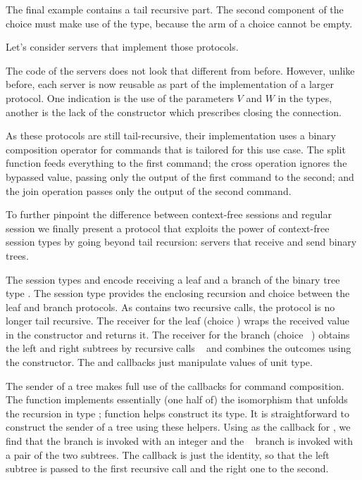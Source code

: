 \documentclass[acmsmall,screen,anonymous,review]{acmart}
\begin{document}
The final example {\Amanyunaryp} contains a tail recursive part. The
second component of the choice must make use of the {\Atcfskip} type,
because the arm of a choice cannot be empty.

Let's consider servers that implement those protocols.
\cstCmdExamples

The code of the servers does not look that different from
before. However, unlike before, each server is now reusable as part of
the implementation of a larger protocol. One indication is the use of
the parameters $V$ and $W$ in the types, another is the lack of the
{\ACEND} constructor which prescribes closing the connection.

As these protocols are still tail-recursive, their implementation uses
a binary composition operator for commands that is tailored for this
use case. The split function feeds everything to the first command; the
cross operation ignores the bypassed value, passing only the output of
the first command to the second; and the join operation passes only
the output of the second command.
\cstTailComposition


To further pinpoint the difference between context-free sessions and
regular session we finally present a protocol that
exploits the power of context-free session types by going beyond tail
recursion: servers that receive and send binary trees. 
\cstTreep

The session types {\Aleafp} and {\Abranchp} encode receiving a leaf and
a branch of the binary tree type {\AIntTree}. The session type
{\Atreep} provides the enclosing recursion and choice between the leaf
and branch protocols. As {\Abranchp} contains two recursive calls,
the protocol {\Atreep} is no longer tail recursive.
\cstRecvTree
The receiver for the leaf (choice {\Azero}) wraps the received value in the {\ACLeaf}
constructor and returns it.
The receiver for the branch (choice {\Asuc~\Azero}) obtains the left and right subtrees by
recursive calls {\ACONTINUE~\Azero} and combines the outcomes using
the {\ACBranch} constructor. The {\Asplit} and {\Across} callbacks
just manipulate values of unit type.

The sender of a tree makes full use of the callbacks for command
composition. 
\cstSendTree
The function {\AsplitTree} implements essentially (one half of) the
isomorphism that unfolds the recursion in type {\AIntTree};
function {\AIntTreeF} helps construct its type. It is straightforward
to construct the sender of a tree using these helpers. Using
{\AsplitTree} as the callback for {\ACSELECT}, we find that the
{\Azero} branch is invoked with an integer and the {\Asuc~\Azero}
branch is invoked with a pair of the two subtrees. The {\Asplit}
callback is just the identity, so that the left subtree is passed to
the first recursive call and the right one to the second.
\end{document}
